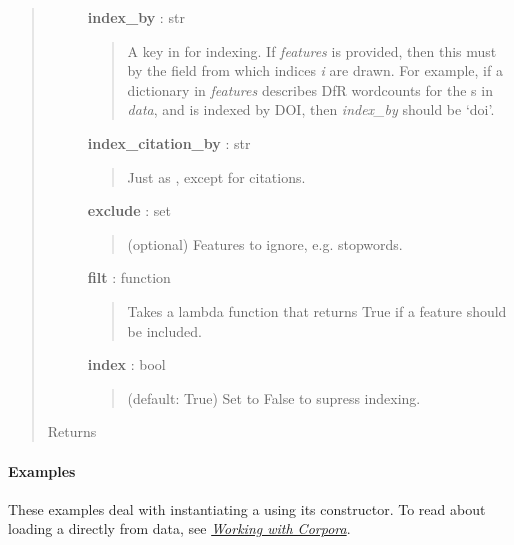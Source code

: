 \documentclass[letterpaper,10pt,english]{sphinxmanual}
\begin{document}
\begin{fulllineitems}
\begin{quote}
\begin{description}
\textbf{index\_by} : str
\begin{quote}

A key in {\hyperref[tethne.classes.paper:tethne.classes.paper.Paper]{}} for indexing. If \emph{features} is provided,
then this must by the field from which indices \emph{i} are drawn. For
example, if a dictionary in \emph{features} describes DfR wordcounts for
the {\hyperref[tethne.classes.paper:tethne.classes.paper.Paper]{}}s in \emph{data}, and is indexed by DOI, then
\emph{index\_by} should be `doi'.
\end{quote}

\textbf{index\_citation\_by} : str
\begin{quote}

Just as , except for citations.
\end{quote}

\textbf{exclude} : set
\begin{quote}

(optional) Features to ignore, e.g. stopwords.
\end{quote}

\textbf{filt} : function
\begin{quote}

Takes a lambda function that returns True if a feature should be
included.
\end{quote}

\textbf{index} : bool
\begin{quote}

(default: True) Set to False to supress indexing.
\end{quote}

\item[{Returns}] \leavevmode
{\hyperref[tethne.classes.corpus:tethne.classes.corpus.Corpus]{}}

\end{description}\end{quote}
\paragraph{Examples}

These examples deal with instantiating a {\hyperref[tethne.classes.corpus:tethne.classes.corpus.Corpus]{}} using its
constructor. To read about loading a {\hyperref[tethne.classes.corpus:tethne.classes.corpus.Corpus]{}} directly from data,
see {\hyperref[corpora:working-with-corpora]{\emph{Working with Corpora}}}.


\end{fulllineitems}
\end{document}
